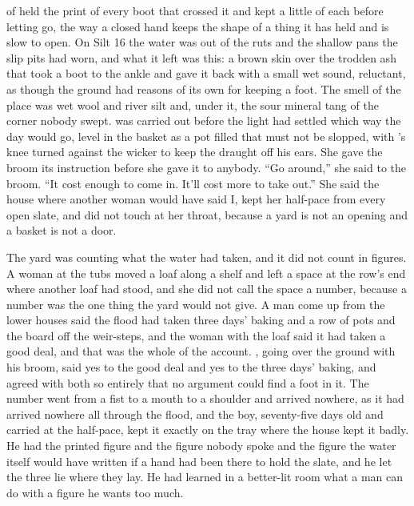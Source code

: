 
 of  held the print of every boot that crossed it and kept a little of each before letting go, the way a closed hand keeps the shape of a thing it has held and is slow to open. On Silt 16 the water was out of the ruts and the shallow pans the slip pits had worn, and what it left was this: a brown skin over the trodden ash that took a boot to the ankle and gave it back with a small wet sound, reluctant, as though the ground had reasons of its own for keeping a foot. The smell of the place was wet wool and river silt and, under it, the sour mineral tang of the corner nobody swept.  was carried out before the light had settled which way the day would go, level in the basket as a pot filled that must not be slopped, with 's knee turned against the wicker to keep the draught off his ears. She gave the broom its instruction before she gave it to anybody. “Go around,” she said to the broom. “It cost enough to come in. It'll cost more to take out.” She said the house where another woman would have said I, kept her half-pace from every open slate, and did not touch  at her throat, because a yard is not an opening and a basket is not a door.

The yard was counting what the water had taken, and it did not count in figures. A woman at the tubs moved a loaf along a shelf and left a space at the row's end where another loaf had stood, and she did not call the space a number, because a number was the one thing the yard would not give. A man come up from the lower houses said the flood had taken three days' baking and a row of pots and the board off the weir-steps, and the woman with the loaf said it had taken a good deal, and that was the whole of the account. , going over the ground with his broom, said yes to the good deal and yes to the three days' baking, and agreed with both so entirely that no argument could find a foot in it. The number went from a fist to a mouth to a shoulder and arrived nowhere, as it had arrived nowhere all through the flood, and the boy, seventy-five days old and carried at the half-pace, kept it exactly on the tray where the house kept it badly. He had the printed figure and the figure nobody spoke and the figure the water itself would have written if a hand had been there to hold the slate, and he let the three lie where they lay. He had learned in a better-lit room what a man can do with a figure he wants too much.

